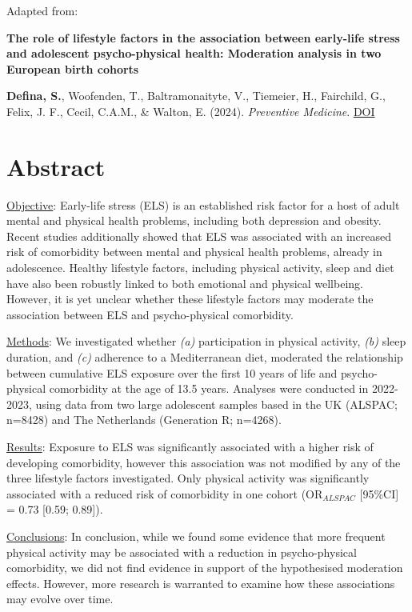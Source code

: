 \documentclass[
  letterpaper,
  DIV=11,
  numbers=noendperiod]{scrreport}
\begin{document}
Adapted from:

\textbf{The role of lifestyle factors in the association between
early-life stress and adolescent psycho-physical health: Moderation
analysis in two European birth cohorts}

\textbf{Defina, S.}, Woofenden, T., Baltramonaityte, V., Tiemeier, H.,
Fairchild, G., Felix, J. F., Cecil, C.A.M., \& Walton, E. (2024).
\emph{Preventive Medicine}.
\href{https://doi.org/10.1016/j.ypmed.2024.107926}{DOI}

\section*{Abstract}\label{abstract-1}


\ul{Objective}: Early-life stress (ELS) is an established risk factor
for a host of adult mental and physical health problems, including both
depression and obesity. Recent studies additionally showed that ELS was
associated with an increased risk of comorbidity between mental and
physical health problems, already in adolescence. Healthy lifestyle
factors, including physical activity, sleep and diet have also been
robustly linked to both emotional and physical wellbeing. However, it is
yet unclear whether these lifestyle factors may moderate the association
between ELS and psycho-physical comorbidity.

\ul{Methods}: We investigated whether \emph{(a)} participation in
physical activity, \emph{(b)} sleep duration, and \emph{(c)} adherence
to a Mediterranean diet, moderated the relationship between cumulative
ELS exposure over the first 10 years of life and psycho-physical
comorbidity at the age of 13.5 years. Analyses were conducted in
2022-2023, using data from two large adolescent samples based in the UK
(ALSPAC; n=8428) and The Netherlands (Generation R; n=4268).

\ul{Results}: Exposure to ELS was significantly associated with a higher
risk of developing comorbidity, however this association was not
modified by any of the three lifestyle factors investigated. Only
physical activity was significantly associated with a reduced risk of
comorbidity in one cohort (OR\emph{\(_{ALSPAC}\)} {[}95\%CI{]} = 0.73
{[}0.59; 0.89{]}).

\ul{Conclusions}: In conclusion, while we found some evidence that more
frequent physical activity may be associated with a reduction in
psycho-physical comorbidity, we did not find evidence in support of the
hypothesised moderation effects. However, more research is warranted to
examine how these associations may evolve over time.
\end{document}
